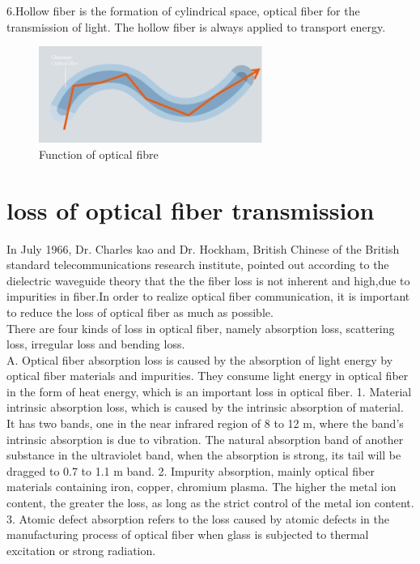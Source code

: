 \documentclass[a4paper]{article}
\begin{document}
6.Hollow fiber is the formation of cylindrical space, optical fiber for the transmission of light. The hollow fiber is always applied to transport energy.\cite{Optical Fibre}
\\
\begin{figure}[h]
	\includegraphics[width=0.65\textwidth]{8.png}
		\caption{Function of optical fibre}
\end{figure}



\section{loss of optical fiber transmission}
\label{sec:Sec8}
In July 1966, Dr. Charles kao and Dr. Hockham, British Chinese of the British standard telecommunications research institute, pointed out according to the dielectric waveguide theory that the the fiber loss is not inherent and high,due to impurities in fiber.In order to realize optical fiber communication, it is important to reduce the loss of optical fiber as much as possible. \cite{Optical Fibre}
\\

There are four kinds of loss in optical fiber, namely absorption loss, scattering loss, irregular loss and bending loss.
\\

A. Optical fiber absorption loss is caused by the absorption of light energy by optical fiber materials and impurities. They consume light energy in optical fiber in the form of heat energy, which is an important loss in optical fiber. 1. Material intrinsic absorption loss, which is caused by the intrinsic absorption of material. It has two bands, one in the near infrared region of 8 to 12 m, where the band's intrinsic absorption is due to vibration. The natural absorption band of another substance in the ultraviolet band, when the absorption is strong, its tail will be dragged to 0.7 to 1.1 m band. 2. Impurity absorption, mainly optical fiber materials containing iron, copper, chromium plasma. The higher the metal ion content, the greater the loss, as long as the strict control of the metal ion content. 3. Atomic defect absorption refers to the loss caused by atomic defects in the manufacturing process of optical fiber when glass is subjected to thermal excitation or strong radiation.\cite{Analogue optical fibre communications}
\\
\end{document}
